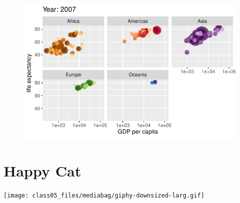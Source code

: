 \documentclass[
  letterpaper,
  DIV=11,
  numbers=noendperiod]{scrartcl}
\begin{document}
\begin{figure}[H]

{\centering \includegraphics{class05_files/figure-pdf/unnamed-chunk-24-100.pdf}

}

\end{figure}

\hypertarget{happy-cat}{%
\section{Happy Cat}\label{happy-cat}}

\texttt{[image: class05\_files/mediabag/giphy-downsized-larg.gif]}
\end{document}
